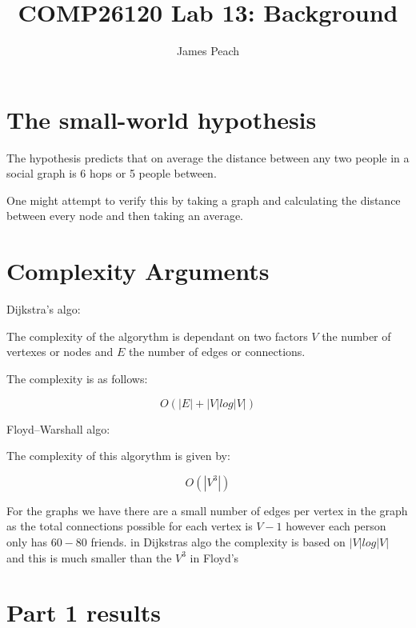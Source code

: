 \documentclass{article}
\title{COMP26120 Lab 13: Background}
\author{James Peach}
\begin{document}
\maketitle


\section{The small-world hypothesis}
\label{sec:small world}

The hypothesis predicts that on average the distance between any two people in
a social graph is 6 hops or 5 people between.

One might attempt to verify this by taking a graph and calculating the distance
between every node and then taking an average.


\section{Complexity Arguments}
\label{sec:complexity}

Dijkstra's algo:

The complexity of the algorythm is dependant on two factors $V$ the number of 
vertexes or nodes and $E$ the number of edges or connections.

The complexity is as follows:

$$O(|E| + |V|log|V|)$$

Floyd–Warshall algo:

The complexity of this algorythm is given by:

$$O(|V^3|)$$

For the graphs we have there are a small number of edges per vertex in the
graph as the total connections possible for each vertex is $V-1$ however each
person only has $60-80$ friends. in Dijkstras algo the complexity is based on 
$|V|log|V|$ and this is much smaller than the $V^3$ in Floyd's

\section{Part 1 results}
\label{sec:part1}
\end{document}

